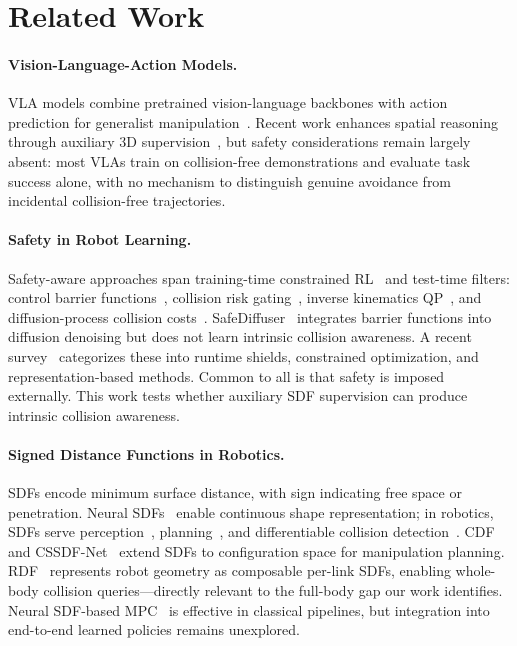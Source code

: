 \section{Related Work}\label{sec:related}

\paragraph{Vision-Language-Action Models.}
VLA models combine pretrained vision-language backbones with action prediction for generalist manipulation~\cite{brohan2023rt2,black2024pi0,chi2023diffusionpolicy,kim2024openvla}. Recent work enhances spatial reasoning through auxiliary 3D supervision~\cite{li2025spatialforcing,li2025qdepth,depthvla2025}, but safety considerations remain largely absent: most VLAs train on collision-free demonstrations and evaluate task success alone, with no mechanism to distinguish genuine avoidance from incidental collision-free trajectories.

\paragraph{Safety in Robot Learning.}
Safety-aware approaches span training-time constrained RL~\cite{zhang2025safevla} and test-time filters: control barrier functions~\cite{hu2025vlsa}, collision risk gating~\cite{cofreeevla2026}, inverse kinematics QP~\cite{spalter2024ikinqp}, and diffusion-process collision costs~\cite{li2024langguided,yang2025cape}. SafeDiffuser~\cite{xiao2025safediffuser} integrates barrier functions into diffusion denoising but does not learn intrinsic collision awareness. A recent survey~\cite{li2026vlasafety} categorizes these into runtime shields, constrained optimization, and representation-based methods. Common to all is that safety is imposed externally. This work tests whether auxiliary SDF supervision can produce intrinsic collision awareness.

\paragraph{Signed Distance Functions in Robotics.}
SDFs encode minimum surface distance, with sign indicating free space or penetration. Neural SDFs~\cite{park2019deepsdf} enable continuous shape representation; in robotics, SDFs serve perception~\cite{ortiz2022isdf}, planning~\cite{huang2023voxposer,vasilopoulos2023ramp}, and differentiable collision detection~\cite{zhi2021diffco}. CDF~\cite{li2024cdf} and CSSDF-Net~\cite{chen2026cssdfnet} extend SDFs to configuration space for manipulation planning. RDF~\cite{li2024rdf} represents robot geometry as composable per-link SDFs, enabling whole-body collision queries---directly relevant to the full-body gap our work identifies. Neural SDF-based MPC~\cite{jacquet2025neuralnmpc} is effective in classical pipelines, but integration into end-to-end learned policies remains unexplored.

